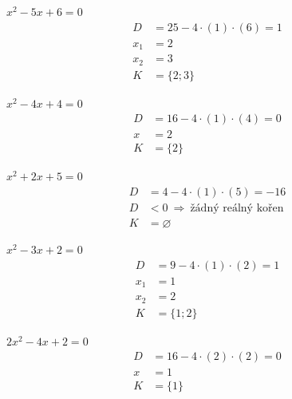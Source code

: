 \documentclass[11pt,a4paper]{article}
\begin{document}
\begin{prikladReseniBox}[title={Příklad 1}]
$x^{2} - 5x + 6=0$
\tcblower
\[
\begin{aligned}
D&=25-4\cdot(1)\cdot(6)=1\\[2pt]
x_1&=2\\[2pt]
x_2&=3\\[2pt]
K&=\{2;3\}
\end{aligned}
\]
\end{prikladReseniBox}
\begin{prikladReseniBox}[title={Příklad 2}]
$x^{2} - 4x + 4=0$
\tcblower
\[
\begin{aligned}
D&=16-4\cdot(1)\cdot(4)=0\\[2pt]
x&=2\\[2pt]
K&=\{2\}
\end{aligned}
\]
\end{prikladReseniBox}
\begin{prikladReseniBox}[title={Příklad 3}]
$x^{2} + 2x + 5=0$
\tcblower
\[
\begin{aligned}
D&=4-4\cdot(1)\cdot(5)=-16\\[2pt]
D&<0\ \Rightarrow\ \text{žádný reálný kořen}\\[2pt]
K&=\varnothing
\end{aligned}
\]
\end{prikladReseniBox}
\begin{zadaniReseniBox}[title={Samostatná práce 1}]
$x^{2} - 3x + 2=0$
\tcblower
\[
\begin{aligned}
D&=9-4\cdot(1)\cdot(2)=1\\[2pt]
x_1&=1\\[2pt]
x_2&=2\\[2pt]
K&=\{1;2\}
\end{aligned}
\]
\end{zadaniReseniBox}
\begin{zadaniReseniBox}[title={Samostatná práce 2}]
$2x^{2} - 4x + 2=0$
\tcblower
\[
\begin{aligned}
D&=16-4\cdot(2)\cdot(2)=0\\[2pt]
x&=1\\[2pt]
K&=\{1\}
\end{aligned}
\]
\end{zadaniReseniBox}
\end{document}
